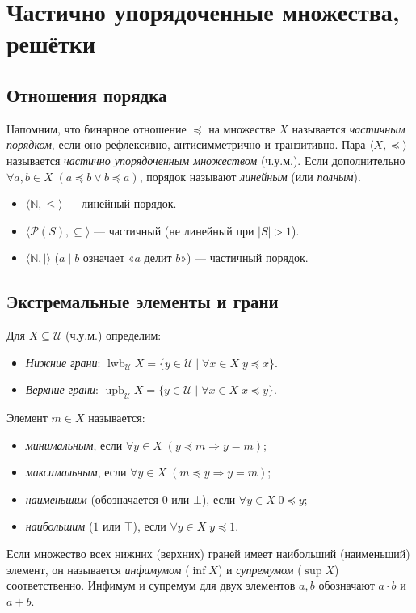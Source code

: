 \documentclass[10pt]{article}
\begin{document}
\section{Частично упорядоченные множества, решётки}
\subsection{Отношения порядка}
Напомним, что бинарное отношение $\preceq$ на множестве $X$ называется \emph{частичным порядком}, если оно рефлексивно, антисимметрично и транзитивно. Пара $\langle X, \preceq \rangle$ называется \emph{частично упорядоченным множеством} (ч.у.м.). Если дополнительно $\forall a,b\in X\; (a\preceq b \lor b\preceq a)$, порядок называют \emph{линейным} (или \emph{полным}).

\begin{example}
\begin{itemize}
    \item $\langle \mathbb{N}, \le \rangle$ — линейный порядок.
    \item $\langle \mathcal{P}(S), \subseteq \rangle$ — частичный (не линейный при $|S|>1$).
    \item $\langle \mathbb{N}, \mid \rangle$ ($a\mid b$ означает «$a$ делит $b$») — частичный порядок.
\end{itemize}
\end{example}

\subsection{Экстремальные элементы и грани}
Для $X \subseteq \mathcal{U}$ (ч.у.м.) определим:
\begin{itemize}
    \item \emph{Нижние грани}: $\operatorname{lwb}_{\mathcal{U}} X = \{ y\in\mathcal{U} \mid \forall x\in X\; y\preceq x \}$.
    \item \emph{Верхние грани}: $\operatorname{upb}_{\mathcal{U}} X = \{ y\in\mathcal{U} \mid \forall x\in X\; x\preceq y \}$.
\end{itemize}
Элемент $m\in X$ называется:
\begin{itemize}
    \item \emph{минимальным}, если $\forall y\in X\; (y\preceq m \Rightarrow y=m)$;
    \item \emph{максимальным}, если $\forall y\in X\; (m\preceq y \Rightarrow y=m)$;
    \item \emph{наименьшим} (обозначается $0$ или $\bot$), если $\forall y\in X\; 0\preceq y$;
    \item \emph{наибольшим} ($1$ или $\top$), если $\forall y\in X\; y\preceq 1$.
\end{itemize}
Если множество всех нижних (верхних) граней имеет наибольший (наименьший) элемент, он называется \emph{инфимумом} ($\inf X$) и \emph{супремумом} ($\sup X$) соответственно. Инфимум и супремум для двух элементов $a,b$ обозначают $a \cdot b$ и $a + b$.
\end{document}
